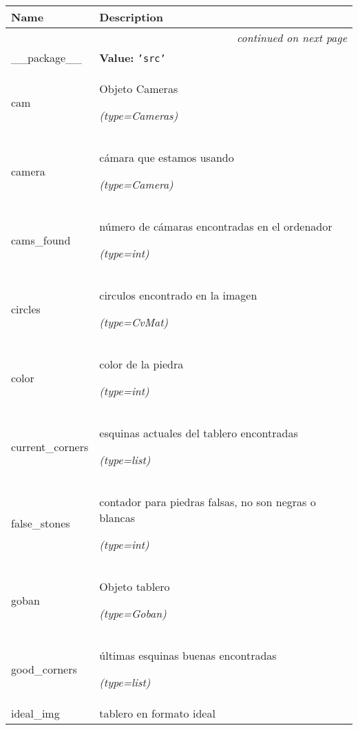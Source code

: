     \vspace{-1cm}
\hspace{\varindent}\begin{longtable}{|p{\varnamewidth}|p{\vardescrwidth}|l}
\cline{1-2}
\cline{1-2} \centering \textbf{Name} & \centering \textbf{Description}& \\
\cline{1-2}
\endhead\cline{1-2}\multicolumn{3}{r}{\small\textit{continued on next page}}\\\endfoot\cline{1-2}
\endlastfoot\raggedright \_\-\_\-p\-a\-c\-k\-a\-g\-e\-\_\-\_\- & \raggedright \textbf{Value:} 
{\tt \texttt{'}\texttt{src}\texttt{'}}&\\
\cline{1-2}
\raggedright c\-a\-m\- & \raggedright Objeto Cameras

            {\it (type=Cameras)}&\\
\cline{1-2}
\raggedright c\-a\-m\-e\-r\-a\- & \raggedright cámara que estamos usando

            {\it (type=Camera)}&\\
\cline{1-2}
\raggedright c\-a\-m\-s\-\_\-f\-o\-u\-n\-d\- & \raggedright número de cámaras encontradas en el ordenador

            {\it (type=int)}&\\
\cline{1-2}
\raggedright c\-i\-r\-c\-l\-e\-s\- & \raggedright circulos encontrado en la imagen

            {\it (type=CvMat)}&\\
\cline{1-2}
\raggedright c\-o\-l\-o\-r\- & \raggedright color de la piedra

            {\it (type=int)}&\\
\cline{1-2}
\raggedright c\-u\-r\-r\-e\-n\-t\-\_\-c\-o\-r\-n\-e\-r\-s\- & \raggedright esquinas actuales del tablero encontradas

            {\it (type=list)}&\\
\cline{1-2}
\raggedright f\-a\-l\-s\-e\-\_\-s\-t\-o\-n\-e\-s\- & \raggedright contador para piedras falsas, no son negras o blancas

            {\it (type=int)}&\\
\cline{1-2}
\raggedright g\-o\-b\-a\-n\- & \raggedright Objeto tablero

            {\it (type=Goban)}&\\
\cline{1-2}
\raggedright g\-o\-o\-d\-\_\-c\-o\-r\-n\-e\-r\-s\- & \raggedright últimas esquinas buenas encontradas

            {\it (type=list)}&\\
\cline{1-2}
\raggedright i\-d\-e\-a\-l\-\_\-i\-m\-g\- & \raggedright tablero en formato ideal


\end{longtable}
